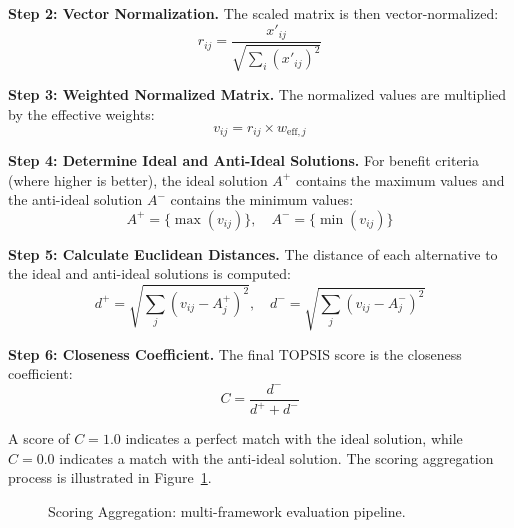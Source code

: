 \textbf{Step 2: Vector Normalization.} The scaled matrix is then vector-normalized:
\begin{equation}
  r_{ij} = \frac{x'_{ij}}{\sqrt{\sum_{i} (x'_{ij})^2}}
  \label{eq:vector_norm}
\end{equation}

\textbf{Step 3: Weighted Normalized Matrix.} The normalized values are multiplied by the effective weights:
\begin{equation}
  v_{ij} = r_{ij} \times w_{\mathrm{eff},j}
  \label{eq:weighted}
\end{equation}

\textbf{Step 4: Determine Ideal and Anti-Ideal Solutions.} For benefit criteria (where higher is better), the ideal solution $A^+$ contains the maximum values and the anti-ideal solution $A^-$ contains the minimum values:
\begin{equation}
  A^+ = \{\max(v_{ij})\}, \quad A^- = \{\min(v_{ij})\}
  \label{eq:ideal}
\end{equation}

\textbf{Step 5: Calculate Euclidean Distances.} The distance of each alternative to the ideal and anti-ideal solutions is computed:
\begin{equation}
  d^+ = \sqrt{\sum_{j} (v_{ij} - A^+_j)^2}, \quad d^- = \sqrt{\sum_{j} (v_{ij} - A^-_j)^2}
  \label{eq:distances}
\end{equation}

\textbf{Step 6: Closeness Coefficient.} The final TOPSIS score is the closeness coefficient:
\begin{equation}
  C = \frac{d^-}{d^+ + d^-}
  \label{eq:closeness}
\end{equation}

A score of $C = 1.0$ indicates a perfect match with the ideal solution, while $C = 0.0$ indicates a match with the anti-ideal solution. The scoring aggregation process is illustrated in Figure~\ref{fig:scoring_flow}.

\begin{figure}[H]
\centering
{}
\caption{Scoring Aggregation: multi-framework evaluation pipeline.}
\label{fig:scoring_flow}
\end{figure}

